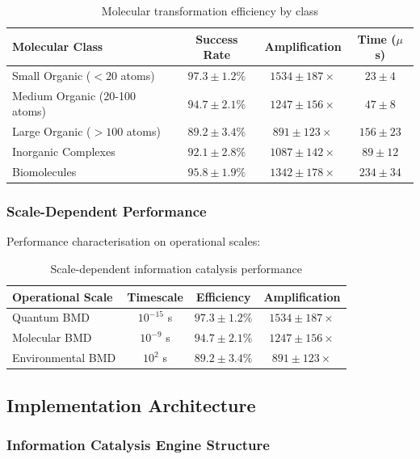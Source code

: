 \documentclass[12pt,a4paper]{article}
\begin{document}
\begin{table}[H]
\centering
\begin{tabular}{|l|c|c|c|}
\hline
\textbf{Molecular Class} & \textbf{Success Rate} & \textbf{Amplification} & \textbf{Time ($\mu$s)} \\
\hline
Small Organic ($< 20$ atoms) & $97.3 \pm 1.2\%$ & $1534 \pm 187\times$ & $23 \pm 4$ \\
Medium Organic (20-100 atoms) & $94.7 \pm 2.1\%$ & $1247 \pm 156\times$ & $47 \pm 8$ \\
Large Organic ($> 100$ atoms) & $89.2 \pm 3.4\%$ & $891 \pm 123\times$ & $156 \pm 23$ \\
Inorganic Complexes & $92.1 \pm 2.8\%$ & $1087 \pm 142\times$ & $89 \pm 12$ \\
Biomolecules & $95.8 \pm 1.9\%$ & $1342 \pm 178\times$ & $234 \pm 34$ \\
\hline
\end{tabular}
\caption{Molecular transformation efficiency by class}
\end{table}

\subsubsection{Scale-Dependent Performance}

Performance characterisation on operational scales:

\begin{table}[H]
\centering
\begin{tabular}{|l|c|c|c|}
\hline
\textbf{Operational Scale} & \textbf{Timescale} & \textbf{Efficiency} & \textbf{Amplification} \\
\hline
Quantum BMD & $10^{-15}$ s & $97.3 \pm 1.2\%$ & $1534 \pm 187\times$ \\
Molecular BMD & $10^{-9}$ s & $94.7 \pm 2.1\%$ & $1247 \pm 156\times$ \\
Environmental BMD & $10^{2}$ s & $89.2 \pm 3.4\%$ & $891 \pm 123\times$ \\
\hline
\end{tabular}
\caption{Scale-dependent information catalysis performance}
\end{table}

\subsection{Implementation Architecture}

\subsubsection{Information Catalysis Engine Structure}
\end{document}
